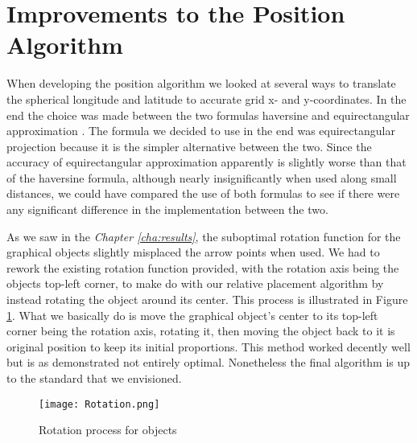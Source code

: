 \section{Improvements to the Position Algorithm}
\label{sec:posimp}

When developing the position algorithm we looked at several ways to translate the spherical longitude and latitude to accurate grid x- and y-coordinates. In the end the choice was made between the two formulas haversine and equirectangular approximation \cite{haversine,equi}. The formula we decided to use in the end was equirectangular projection because it is the simpler alternative between the two. Since the accuracy of equirectangular approximation apparently is slightly worse than that of the haversine formula, although nearly insignificantly when used along small distances, we could have compared the use of both formulas to see if there were any significant difference in the implementation between the two. 

As we saw in the \textit{Chapter \ref{cha:results}}, the suboptimal rotation function for the graphical objects slightly misplaced the arrow points when used. We had to rework the existing rotation function provided, with the rotation axis being the objects top-left corner, to make do with our relative placement algorithm by instead rotating the object around its center. This process is illustrated in Figure \ref{fig:rotation}. What we basically do is move the graphical object's center to its top-left corner being the rotation axis, rotating it, then moving the object back to it is original position to keep its initial proportions. This method worked decently well but is as demonstrated not entirely optimal. Nonetheless the final algorithm is up to the standard that we envisioned. 

\begin{figure}[ht!]
\begin{center}
	\texttt{[image: Rotation.png]}
	\caption{Rotation process for objects}
	\label{fig:rotation}
\end{center}
\end{figure}

\newpage

